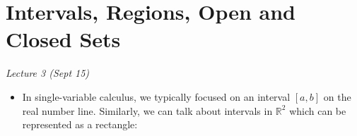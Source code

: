\section{Intervals, Regions, Open and Closed Sets}
\textit{Lecture 3 (Sept 15)}
\begin{itemize}
    \item In single-variable calculus, we typically focused on an interval $[a,b]$ on the real number line. Similarly, we can talk about intervals in $\mathbb{R}^2$ which can be represented as a rectangle:
          \begin{center}
\end{center}
\end{itemize}
